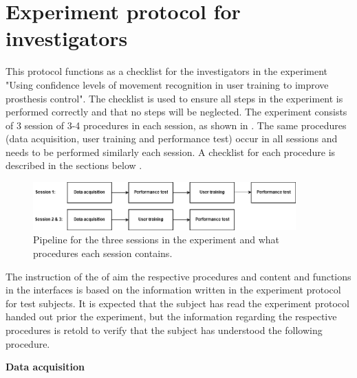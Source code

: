 
\section*{Experiment protocol for investigators}

This protocol functions as a checklist for the investigators in the experiment "Using confidence levels of movement recognition in user training to improve prosthesis control". The checklist is used to ensure all steps in the experiment is performed correctly and that no steps will be neglected. The experiment consists of 3 session of 3-4 procedures in each session, as shown in . The same procedures (data acquisition, user training and performance test) occur in all sessions and needs to be performed similarly each session. A checklist for each procedure is described in the sections below .

\begin{figure}[H]                                         
	\includegraphics[width=0.9\textwidth]{figures/pMethods/experiment_protocol_pipeline}  
	\caption{Pipeline for the three sessions in the experiment and what procedures each session contains.}
	\label{fig:experiment_protocol_pipeline_investigators} 
\end{figure} 

The instruction of the of aim the respective procedures and content and functions in the interfaces is based on the information written in the experiment protocol for test subjects. It is expected that the subject has read the experiment protocol handed out prior the experiment, but the information regarding the respective procedures is retold to verify that the subject has understood the following procedure.

\textbf{\large Data acquisition}

